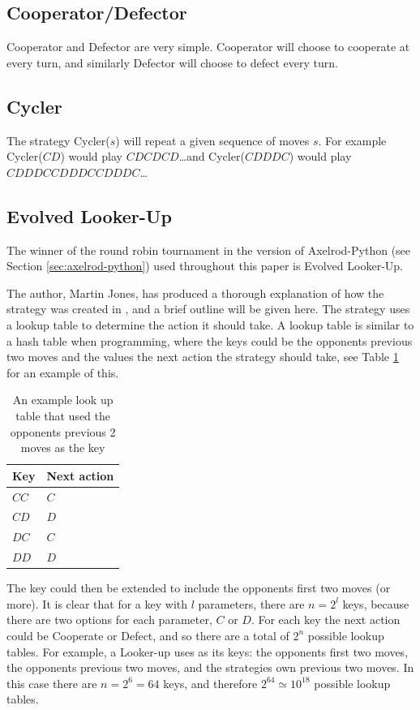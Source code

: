 \subsection{Cooperator/Defector}\label{ssec:strat_coop_defect}
Cooperator and Defector are very simple.
Cooperator will choose to cooperate at every turn, and similarly Defector will choose to defect every turn.

\subsection{Cycler}\label{ssec:strat_cycler}
The strategy Cycler($s$) will repeat a given sequence of moves $s$.
For example Cycler($CD$) would play $CDCDCD$\dots and Cycler($CDDDC$) would play $CDDDCCDDDCCDDDC$\dots

\subsection{Evolved Looker-Up}\label{ssec:strat_evolved_lu}
The winner of the round robin tournament in the version of Axelrod-Python (see Section \ref{sec:axelrod-python}) used throughout this paper is Evolved Looker-Up.

The author, Martin Jones, has produced a thorough explanation of how the strategy was created in \cite{MoJones}, and a brief outline will be given here.
The strategy uses a lookup table to determine the action it should take.
A lookup table is similar to a hash table when programming, where the keys could be the opponents previous two moves and the values the next action the strategy should take, see Table \ref{tab:lookup_table} for an example of this.

\begin{table}[htbp]
    \centering
    \begin{tabular}{l l}
        \toprule
        Key & Next action \\
        \midrule
        $CC$ & $C$ \\
        $CD$ & $D$ \\
        $DC$ & $C$ \\
        $DD$ & $D$ \\
        \bottomrule
    \end{tabular}
    \caption{An example look up table that used the opponents previous 2 moves as the key}
    \label{tab:lookup_table}
\end{table}

The key could then be extended to include the opponents first two moves (or more).
It is clear that for a key with $l$ parameters, there are $n = 2^l$ keys, because there are two options for each parameter, $C$ or $D$.
For each key the next action could be Cooperate or Defect, and so there are a total of $2^n$ possible lookup tables.
For example, a Looker-up uses as its keys: the opponents first two moves, the opponents previous two moves, and the strategies own previous two moves.
In this case there are $n = 2^6 = 64$ keys, and therefore $2^{64} \simeq 10^{18}$ possible lookup tables.


